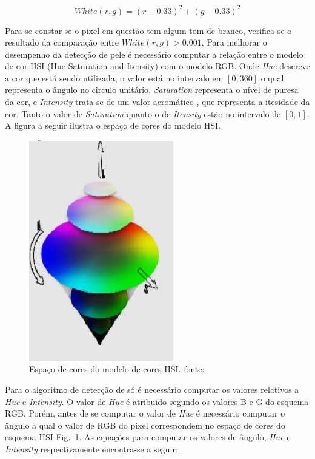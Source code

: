 \documentclass[journal,onecolumn]{IEEEtran}
\begin{document}
	\begin{equation}
		White(r,g) = (r - 0.33)^2 + (g - 0.33)^2 
		\label{eq:whiteValue}
	\end{equation}
	
	Para se constar se o pixel em questão tem algum tom de branco, verifica-se o resultado da comparação entre $White(r,g) > 0.001$.
	Para melhorar o desempenho da detecção de pele é necessário computar a relação entre o modelo de cor HSI (Hue Saturation and Itensity) com o modelo RGB.
	Onde \textit{Hue} descreve a cor que está sendo utilizada, o valor está no intervalo em $[0,360]$ o qual representa o ângulo no circulo unitário.
	\textit{Saturation} representa o nível de puresa da cor, e \textit{Intensity} trata-se de um valor acromático , que representa a itesidade da cor.
	Tanto o valor de \textit{Saturation} quanto o de \textit{Itensity} estão no intervalo de $[0,1]$.
	A figura a seguir ilustra o espaço de cores do modelo HSI. 

		\begin{figure}[htb]
		\begin{center}		
			\includegraphics[scale=0.3]{espaco_hsi.png}
			\caption{Espaço de cores do modelo de cores HSI. fonte:\cite{ibraheem2012understanding} }
			\label{fig:espacoCoresHSI}
		\end{center}
		\end{figure}
	
	Para o algoritmo de detecção de só é necessário computar os valores relativos a \textit{Hue} e \textit{Intensity}.
	O valor de \textit{Hue} é atribuido segundo os valores B e G do esquema RGB. 
	Porém, antes de se computar o valor de \textit{Hue} é necessário computar o ângulo a qual o valor de RGB do pixel correspondem no espaço de cores do esquema HSI Fig.~\ref{fig:espacoCoresHSI}.
	As equações para computar os valores de ângulo, \textit{Hue} e \textit{Intensity} respectivamente encontra-se a seguir:
	
\end{document}

